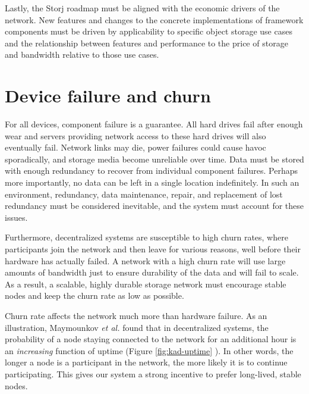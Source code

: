 \documentclass[8pt,fleqn,openany]{book}
\begin{document}
Lastly, the Storj roadmap must be aligned with the economic drivers of the
network.
New features and changes to the concrete implementations of framework
components must be driven by applicability to specific object storage use cases
and the relationship between features and performance to the price of storage
and bandwidth relative to those use cases.

\section{Device failure and churn}

For all devices, component failure is a guarantee.
All hard drives fail after enough wear
\cite{backblaze-hd-2018-q1} and servers providing network access to
these hard drives will also eventually fail. Network links may die, power
failures could cause havoc sporadically,
and storage media become unreliable over time.
Data must be stored with enough redundancy to recover from
individual component failures.
Perhaps more importantly, no data can be left in a single location
indefinitely. In such an environment, redundancy, data
maintenance, repair, and replacement of lost redundancy must be considered
inevitable, and the system must account for these issues.

Furthermore, decentralized systems are susceptible to high churn rates, where
participants join the network and then leave for various reasons, well
before their hardware has actually failed. A network with a high churn rate will
use large amounts of bandwidth just to ensure durability of the data and
will fail to scale. As a result, a scalable, highly durable storage
network must encourage stable nodes and keep the churn rate as low as possible.

Churn rate affects the network much more than hardware failure. As an
illustration, Maymounkov {\em et al.} found that in
decentralized systems, the probability of a node staying connected to the
network for an additional hour is an {\em increasing}
function of uptime (Figure \ref{fig:kad-uptime} \cite{kad}).
In other words, the longer a node is a
participant in the network, the more likely it is to continue
participating. This gives our system a strong incentive to prefer long-lived,
stable nodes.
\end{document}
